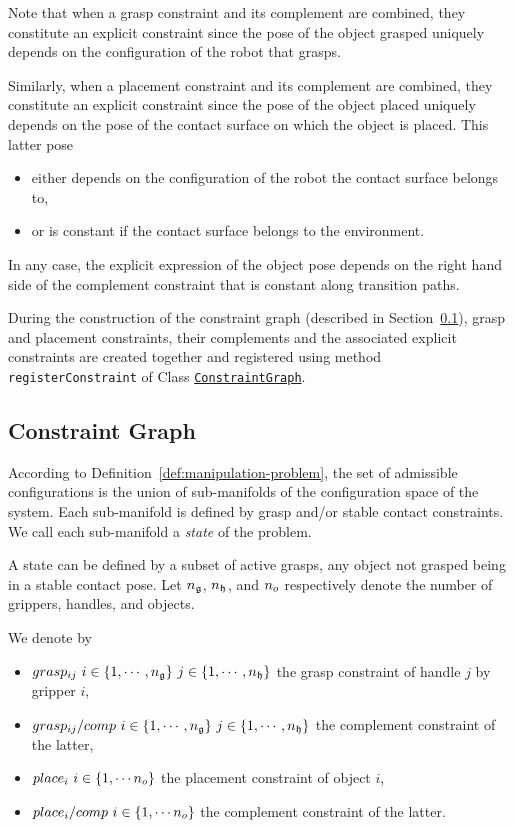 Note that when a grasp constraint and its complement are combined, they
constitute an explicit constraint since the pose of the object grasped
uniquely depends on the configuration of the robot that grasps.

Similarly, when a placement constraint and its complement are combined, they
constitute an explicit constraint since the pose of the object placed uniquely
depends on the pose of the contact surface on which the object is placed. This
latter pose
\begin{itemize}
\item either depends on the configuration of the robot the contact surface
  belongs to,
\item or is constant if the contact surface belongs to the environment.
\end{itemize}
In any case, the explicit expression of the object pose depends on the right
hand side of the complement constraint that is constant along transition paths.

During the construction of the constraint graph (described in Section~\ref{subsec:constraint graph}), grasp and placement
constraints, their complements and the associated explicit constraints
are created together and registered using method\\
\texttt{registerConstraint} of Class
\href{https://gepettoweb.laas.fr/hpp/hpp-manipulation/doxygen-html/classhpp_1_1manipulation_1_1graph_1_1Graph.html}{\texttt{ConstraintGraph}}.

\subsection{Constraint Graph}\label{subsec:constraint graph}

According to Definition~\ref{def:manipulation-problem}, the set of admissible configurations is the union of sub-manifolds of the configuration space of the system. Each sub-manifold is defined by grasp and/or stable contact constraints. We call each sub-manifold a \textit{state} of the problem.

A state can be defined by a subset of active grasps, any object not grasped being in a stable contact pose. Let $n_{\mathfrak{g}}$, $n_{\mathfrak{h}}$, and $n_{o}$ respectively denote the number of grippers, handles, and objects.

We denote by
\begin{itemize}
\item $grasp_{ij}\ i\in\{1,\cdots,\ngrippers\}\ j\in\{1,\cdots,\nhandles\}$ the grasp constraint of handle $j$ by gripper $i$,
\item $grasp_{ij}/comp\ i\in\{1,\cdots,\ngrippers\}\ j\in\{1,\cdots,\nhandles\}$ the complement constraint of the latter,
\item $place_{i}\ i\in\{1,\cdots\nobjects\}$ the placement constraint of object $i$,
\item $place_{i}/comp\ i\in\{1,\cdots\nobjects\}$ the complement constraint of the latter.
\end{itemize}


